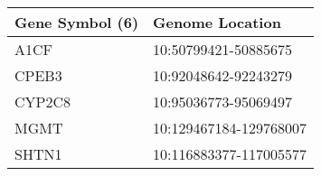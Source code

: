 \begin{tabular}{ll}
\toprule
Gene Symbol (6) &        Genome Location \\
\midrule
           A1CF &   10:50799421-50885675 \\
          CPEB3 &   10:92048642-92243279 \\
         CYP2C8 &   10:95036773-95069497 \\
           MGMT & 10:129467184-129768007 \\
          SHTN1 & 10:116883377-117005577 \\
\bottomrule
\end{tabular}
